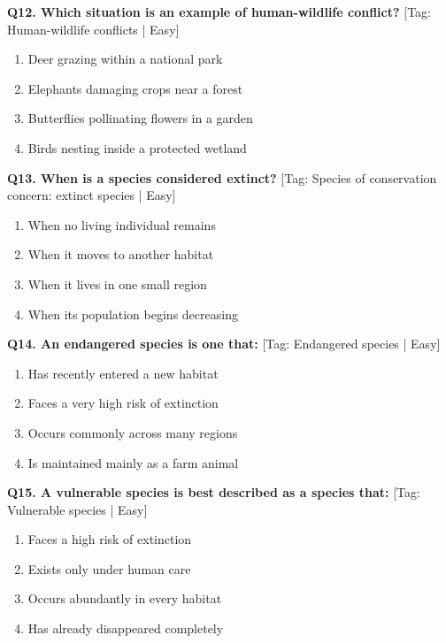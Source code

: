 \noindent\textbf{Q12. Which situation is an example of human-wildlife conflict?} \hfill [Tag: Human-wildlife conflicts | Easy]
\begin{enumerate}[label=(\alph*),topsep=2pt,itemsep=1pt,partopsep=0pt,parsep=0pt]
    \item {Deer grazing within a national park}
    \item {Elephants damaging crops near a forest}
    \item {Butterflies pollinating flowers in a garden}
    \item {Birds nesting inside a protected wetland}
\end{enumerate}
\vspace{2mm}

\noindent\textbf{Q13. When is a species considered extinct?} \hfill [Tag: Species of conservation concern: extinct species | Easy]
\begin{enumerate}[label=(\alph*),topsep=2pt,itemsep=1pt,partopsep=0pt,parsep=0pt]
    \item {When no living individual remains}
    \item {When it moves to another habitat}
    \item {When it lives in one small region}
    \item {When its population begins decreasing}
\end{enumerate}
\vspace{2mm}

\noindent\textbf{Q14. An endangered species is one that:} \hfill [Tag: Endangered species | Easy]
\begin{enumerate}[label=(\alph*),topsep=2pt,itemsep=1pt,partopsep=0pt,parsep=0pt]
    \item {Has recently entered a new habitat}
    \item {Faces a very high risk of extinction}
    \item {Occurs commonly across many regions}
    \item {Is maintained mainly as a farm animal}
\end{enumerate}
\vspace{2mm}

\noindent\textbf{Q15. A vulnerable species is best described as a species that:} \hfill [Tag: Vulnerable species | Easy]
\begin{enumerate}[label=(\alph*),topsep=2pt,itemsep=1pt,partopsep=0pt,parsep=0pt]
    \item {Faces a high risk of extinction}
    \item {Exists only under human care}
    \item {Occurs abundantly in every habitat}
    \item {Has already disappeared completely}
\end{enumerate}
\vspace{2mm}

